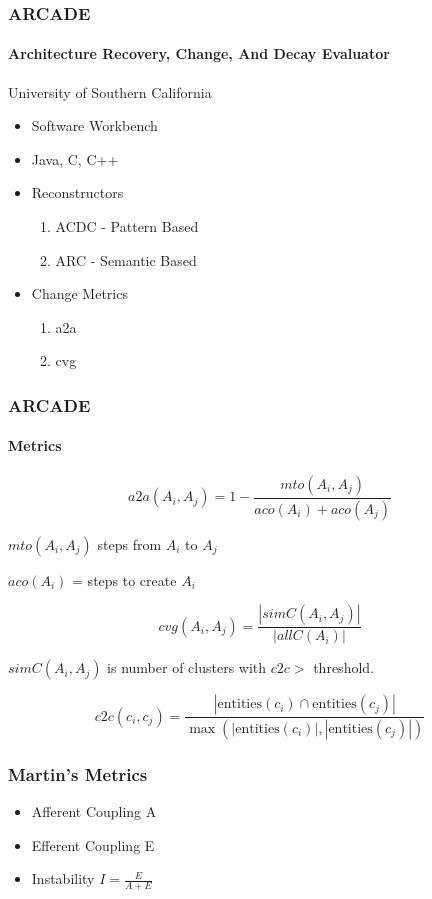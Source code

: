 \documentclass{beamer}
\begin{document}
\begin{frame}
	\frametitle{ARCADE}
	\framesubtitle{Architecture Recovery, Change, And Decay Evaluator }
	
	University of Southern California
	
	\begin{itemize}
		\item Software Workbench
		\item Java, C, C++
		\item Reconstructors
		\begin{enumerate}
			\item ACDC - Pattern Based
			\item ARC - Semantic Based
		\end{enumerate}
		\item Change Metrics
		\begin{enumerate}
			\item a2a
			\item cvg
		\end{enumerate}
	\end{itemize}
		
\end{frame}

\begin{frame}
	\frametitle{ARCADE}
	\framesubtitle{Metrics}
	
		\[
		a2a(A_i, A_j) = 1 - \frac{mto(A_i, A_j)}{aco(A_i) + aco(A_j)}
		\]
		
		$mto(A_i, A_j)$ steps from $A_i$ to $A_j$
		
		$aco(A_i)$ = steps to create $A_i$
		
		\pause
		
		\[
		cvg(A_i, A_j) = \frac{|simC(A_i, A_j)|}{|allC(A_i)|}
		\]
		
		$simC(A_i, A_j)$ is number of clusters with $c2c >$ threshold. 
		
		\[
		c2c(c_i, c_j) = \frac{|\text{entities}(c_i) \cap \text{entities}(c_j)|}{\max(|\text{entities}(c_i)|, |\text{entities}(c_j)|)}
		\]
\end{frame}

\begin{frame}
	\frametitle{Martin's Metrics}
	
	\begin{itemize}
		\item Afferent Coupling A
		\item Efferent Coupling E
		\item Instability $I = \frac{E}{A + E} $
	\end{itemize}
	
\end{frame}
\end{document}

